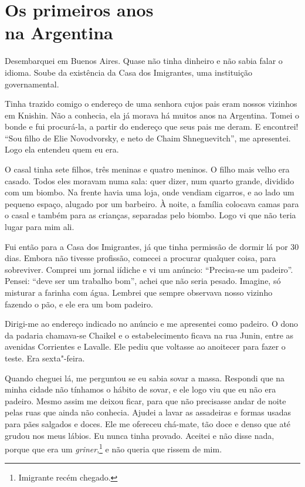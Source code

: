\chapter*{Os primeiros anos\\na Argentina}

Desembarquei em Buenos Aires. Quase não tinha dinheiro e não sabia falar
o idioma. Soube da existência da Casa dos Imigrantes, uma instituição governamental.

Tinha trazido comigo o endereço de uma senhora cujos pais eram nossos
vizinhos em Knishin. Não a conhecia, ela já morava há muitos anos
na Argentina. Tomei o bonde e fui procurá-la, a partir do endereço que seus pais me deram. E encontrei! ``Sou filho de Elie Novodvorsky, e neto de Chaim Shneguevitch'', me
apresentei. Logo ela entendeu quem eu era.

O casal tinha sete filhos, três meninas e quatro meninos. O filho mais
velho era casado. Todos eles moravam numa sala: quer dizer, num quarto
grande, dividido com um biombo. Na frente havia uma loja, onde vendiam cigarros, e ao lado um pequeno espaço, alugado por um
barbeiro. À noite, a família colocava camas para o casal e também para as
crianças, separadas pelo biombo. Logo vi que não teria lugar para
mim ali.

Fui então para a Casa dos Imigrantes, já que tinha permissão de dormir
lá por 30 dias. Embora não tivesse profissão, comecei a procurar qualquer
coisa, para sobreviver. Comprei um jornal iídiche e vi um anúncio:
``Precisa-se um padeiro''. Pensei: ``deve ser um trabalho bom'', achei
que não seria pesado. Imagine, só misturar a farinha com água. Lembrei que sempre observava nosso vizinho fazendo o pão, e ele era um
bom padeiro.

Dirigi-me ao endereço indicado no anúncio e me apresentei como padeiro.
O dono da padaria chamava-se Chaikel e o estabelecimento ficava na rua
Junin, entre as avenidas Corrientes e Lavalle. Ele pediu que voltasse ao
anoitecer para fazer o teste. Era sexta"-feira. 

Quando cheguei lá, me perguntou se eu sabia sovar a massa. Respondi que na minha cidade não
tínhamos o hábito de sovar, e ele logo viu que eu não era padeiro.
Mesmo assim me deixou ficar, para que não precisasse andar de noite pelas ruas que
ainda não conhecia. Ajudei a lavar as assadeiras e formas usadas para pães salgados e doces. Ele me ofereceu chá-mate, tão doce e denso que até grudou nos
meus lábios. Eu nunca tinha provado. Aceitei e não disse nada, porque
que era um \textit{griner},\footnote{Imigrante recém chegado.} e não queria
que rissem de mim.


